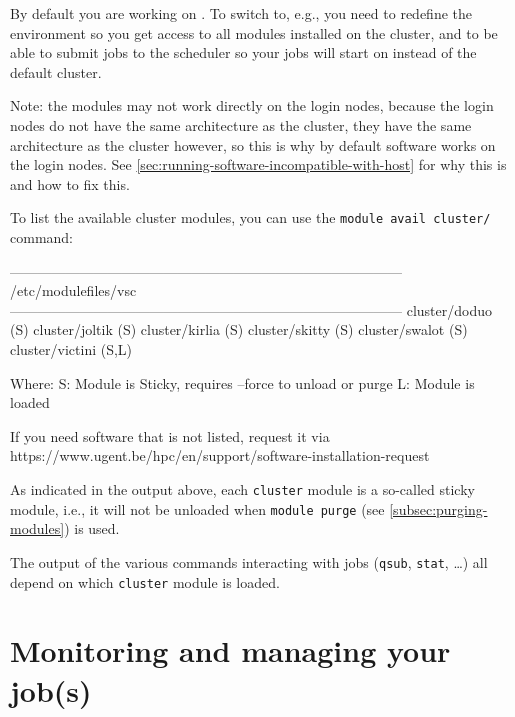 By default you are working on . To switch to, e.g., \othercluster you need
to redefine the environment so you get access to all modules installed on
the \othercluster cluster, and to be able to submit jobs to the \othercluster scheduler
so your jobs will start on \othercluster instead of the default  cluster.

\begin{prompt}
\end{prompt}

Note: the \othercluster modules may not work directly on the login nodes, because the
login nodes do not have the same architecture as the \othercluster cluster, they
have the same architecture as the  cluster however, so this is why
by default software works on the login nodes. See \autoref{sec:running-software-incompatible-with-host}
for why this is and how to fix this.

To list the available cluster modules, you can use the \lstinline|module avail cluster/| command:
\begin{prompt}
------------------------------------------------------------------------------------ /etc/modulefiles/vsc ------------------------------------------------------------------------------------
   cluster/doduo (S)    cluster/joltik (S)    cluster/kirlia (S)    cluster/skitty (S)    cluster/swalot (S)    cluster/victini (S,L)

  Where:
   S:  Module is Sticky, requires --force to unload or purge
   L:  Module is loaded

If you need software that is not listed, request it via https://www.ugent.be/hpc/en/support/software-installation-request
\end{prompt}

As indicated in the output above, each \lstinline|cluster| module is a so-called sticky
module, i.e., it will not be unloaded when \lstinline|module purge| (see \autoref{subsec:purging-modules}) is used.

The output of the various commands interacting with jobs (\lstinline|qsub|, \lstinline|stat|, \ldots)
all depend on which \lstinline|cluster| module is loaded.
\fi


\section{Monitoring and managing your job(s)}
\label{sec:monitoring-and-managing-your-jobs}


